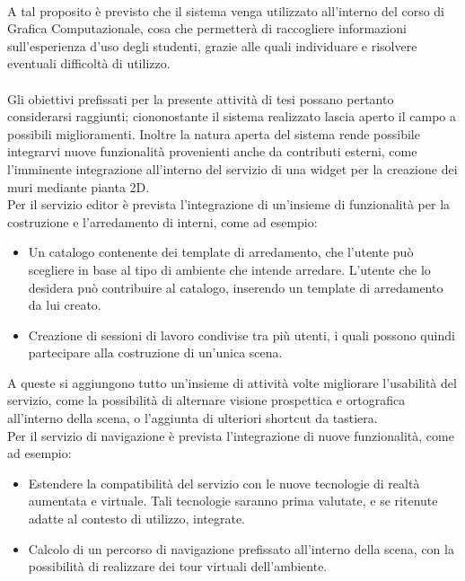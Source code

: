 \\
A tal proposito è previsto che il sistema venga utilizzato all’interno del corso di Grafica Computazionale, cosa che permetterà di raccogliere informazioni sull’esperienza d’uso degli studenti, grazie alle quali individuare e risolvere eventuali difficoltà di utilizzo.
\\
\\
Gli obiettivi prefissati per la presente attività di tesi possano pertanto considerarsi raggiunti; ciononostante il sistema realizzato lascia aperto il campo a possibili miglioramenti. 
Inoltre la natura aperta del sistema rende possibile integrarvi nuove funzionalità provenienti anche da contributi esterni, come l’imminente integrazione all’interno del servizio di una widget per la creazione dei muri mediante pianta 2D. 
\\
Per il servizio editor è prevista l’integrazione di un’insieme di funzionalità per la costruzione e l’arredamento di interni, come ad esempio:
\begin{itemize}
\item Un catalogo contenente dei template di arredamento, che l’utente può scegliere in base al tipo di ambiente che intende arredare. L’utente che lo desidera può contribuire al catalogo, inserendo un template di arredamento da lui creato.
\item Creazione di sessioni di lavoro condivise tra più utenti, i quali possono quindi partecipare alla costruzione di un’unica scena.
\end{itemize}
A queste si aggiungono tutto un’insieme di attività volte migliorare l’usabilità del servizio, come la possibilità di alternare visione prospettica e ortografica all’interno della scena, o l’aggiunta di ulteriori shortcut da tastiera.
\\
Per il servizio di navigazione è prevista l’integrazione di nuove funzionalità, come ad esempio:
\begin{itemize}
\item Estendere la compatibilità del servizio con le nuove tecnologie di realtà aumentata e virtuale. Tali tecnologie saranno prima valutate, e se ritenute adatte al contesto di utilizzo, integrate. 
\item Calcolo di un percorso di navigazione prefissato all’interno della scena, con la possibilità di realizzare dei tour virtuali dell’ambiente.
\end{itemize}

